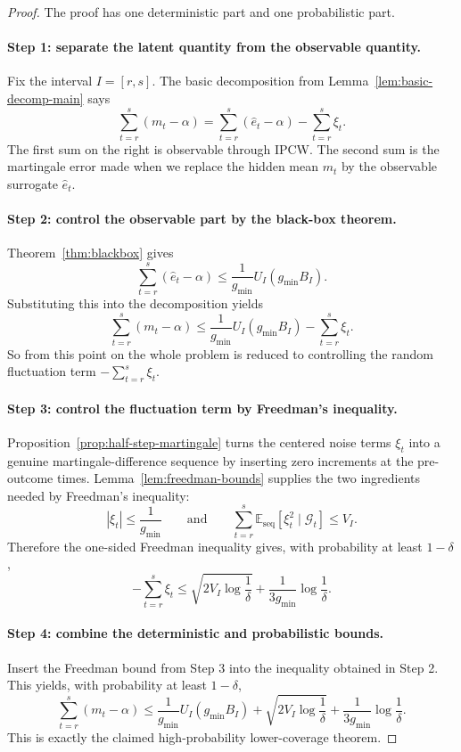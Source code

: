 \documentclass[11pt]{article}
\newcommand{\E}{\mathbb{E}}
\newcommand{\1}{\mathbf{1}}
\newcommand{\seq}{\mathrm{seq}}
\newcommand{\cG}{\mathcal{G}}
\begin{document}
\begin{proof}
The proof has one deterministic part and one probabilistic part.

\paragraph{Step 1: separate the latent quantity from the observable quantity.}
Fix the interval $I=[r,s]$. The basic decomposition from Lemma~\ref{lem:basic-decomp-main} says
\[
\sum_{t=r}^s(m_t-\alpha)
=
\sum_{t=r}^s(\hat e_t-\alpha)-\sum_{t=r}^s\xi_t.
\]
The first sum on the right is observable through IPCW. The second sum is the martingale error made when we replace the hidden mean $m_t$ by the observable surrogate $\hat e_t$.

\paragraph{Step 2: control the observable part by the black-box theorem.}
Theorem~\ref{thm:blackbox} gives
\[
\sum_{t=r}^s(\hat e_t-\alpha)
\le
\frac{1}{g_{\min}}U_I(g_{\min}B_I).
\]
Substituting this into the decomposition yields
\[
\sum_{t=r}^s(m_t-\alpha)
\le
\frac{1}{g_{\min}}U_I(g_{\min}B_I)-\sum_{t=r}^s\xi_t.
\]
So from this point on the whole problem is reduced to controlling the random fluctuation term $-\sum_{t=r}^s\xi_t$.

\paragraph{Step 3: control the fluctuation term by Freedman's inequality.}
Proposition~\ref{prop:half-step-martingale} turns the centered noise terms $\xi_t$ into a genuine martingale-difference sequence by inserting zero increments at the pre-outcome times. Lemma~\ref{lem:freedman-bounds} supplies the two ingredients needed by Freedman's inequality:
\[
|\xi_t|\le \frac{1}{g_{\min}}
\qquad\text{and}\qquad
\sum_{t=r}^s \E_{\seq}[\xi_t^2\mid \cG_t]\le V_I.
\]
Therefore the one-sided Freedman inequality gives, with probability at least $1-\delta$,
\[
-\sum_{t=r}^s\xi_t
\le
\sqrt{2V_I\log\frac{1}{\delta}}
+
\frac{1}{3g_{\min}}\log\frac{1}{\delta}.
\]

\paragraph{Step 4: combine the deterministic and probabilistic bounds.}
Insert the Freedman bound from Step 3 into the inequality obtained in Step 2. This yields, with probability at least $1-\delta$,
\[
\sum_{t=r}^s(m_t-\alpha)
\le
\frac{1}{g_{\min}}U_I(g_{\min}B_I)
+
\sqrt{2V_I\log\frac{1}{\delta}}
+
\frac{1}{3g_{\min}}\log\frac{1}{\delta}.
\]
This is exactly the claimed high-probability lower-coverage theorem.
\end{proof}
\end{document}
